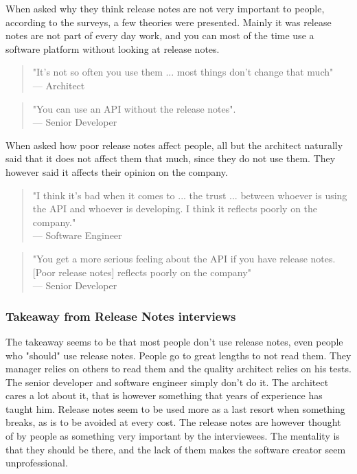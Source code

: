 \documentclass{cslthse-msc}
\begin{document}
    When asked why they think release notes are not very important to people, according to the surveys, a few theories were presented. Mainly it was release notes are not part of every day work, and you can most of the time use a software platform without looking at release notes.
    \begin{quote}
        "It's not so often you use them ... most things don't change that much" \\
        --- Architect
    \end{quote}
    \begin{quote}
        "You can use an API without the release notes".\\
        --- Senior Developer
    \end{quote}
    When asked how poor release notes affect people, all but the architect naturally said that it does not affect them that much, since they do not use them. They however said it affects their opinion on the company.
    \begin{quote}
        "I think it's bad when it comes to ... the trust ... between whoever is using the API and whoever is developing. I think it reflects poorly on the company."\\
        --- Software Engineer
    \end{quote}
    \begin{quote}
        "You get a more serious feeling about the API if you have release notes. [Poor release notes] reflects poorly on the company"\\
        --- Senior Developer
    \end{quote}
    \subsubsection{Takeaway from Release Notes interviews}
    The takeaway seems to be that most people don't use release notes, even people who "should" use release notes. People go to great lengths to not read them. They manager relies on others to read them and the quality architect relies on his tests. The senior developer and software engineer simply don't do it. The architect cares a lot about it, that is however something that years of experience has taught him. Release notes seem to be used more as a last resort when something breaks, as is to be avoided at every cost. The release notes are however thought of by people as something very important by the interviewees. The mentality is that they should be there, and the lack of them makes the software creator seem unprofessional.
\end{document}
